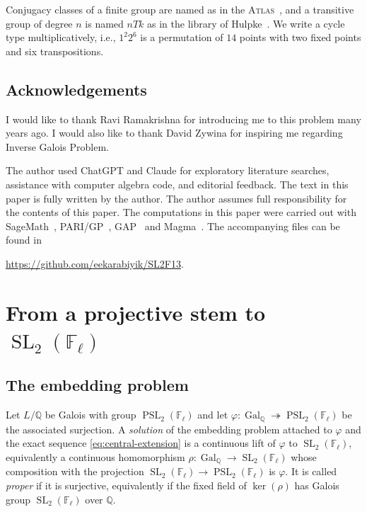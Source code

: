 \documentclass[10pt]{amsart}
\numberwithin{equation}{section}
\newcommand{\GQ}{\Gal_{\Q}}
\theoremstyle{definition}
\theoremstyle{remark}
\newcommand{\F}{\mathbb{F}}
\newcommand{\Q}{\mathbb{Q}}
\newcommand{\SL}{\operatorname{SL}}
\newcommand{\PSL}{\operatorname{PSL}}
\newcommand{\Gal}{\operatorname{Gal}}
\begin{document}
Conjugacy classes of a finite group are named as in the
\textsc{Atlas}~\cite{Atlas1985}, and a transitive group of degree $n$ is
named $n T k$ as in the library of Hulpke~\cite{TransGrp}. We write a cycle type multiplicatively, i.e., $1^2 2^6$ is a permutation of $14$ points with two
fixed points and six transpositions. 


\subsection*{Acknowledgements}

 


I would like to thank Ravi Ramakrishna for introducing me to this problem many years ago. I would also like to thank David Zywina for inspiring me regarding Inverse Galois Problem. 

The author used ChatGPT and Claude for exploratory literature searches, assistance with computer algebra code, and editorial feedback. The text in this paper is fully written by the author. The author assumes full responsibility for the contents of this paper. 
The computations in this paper were carried out with
SageMath~\cite{SageMath}, PARI/GP~\cite{PARI2}, GAP~\cite{GAP} and Magma~\cite{Magma}. The accompanying files can be found in 
\begin{center}
    \href{https://github.com/eekarabiyik/SL2F13}{https://github.com/eekarabiyik/SL2F13}.
\end{center}


\section{From a projective stem to \texorpdfstring{$\SL_2(\F_\ell)$}
  {SL2(Fl)}}\label{sec:common}

\subsection{The embedding problem}\label{subsec:embedding}
Let $L/\Q$ be Galois with group $\PSL_2(\F_\ell)$ and let
$\varphi\colon\GQ\twoheadrightarrow \PSL_2(\F_\ell)$ be the associated surjection.  A
\emph{solution} of the embedding problem attached to $\varphi$ and the exact sequence
\eqref{eq:central-extension} is a continuous lift of $\varphi$ to $\SL_2(\F_\ell)$, equivalently a continuous homomorphism
$\rho\colon\GQ\to\SL_2(\F_\ell)$ whose composition with the projection
$\SL_2(\F_\ell)\to \PSL_2(\F_\ell)$ is $\varphi$. It is called \emph{proper} if it is surjective, equivalently if the fixed field of $\ker(\rho)$ has Galois group $\SL_2(\F_\ell)$ over $\Q$. 
\end{document}
